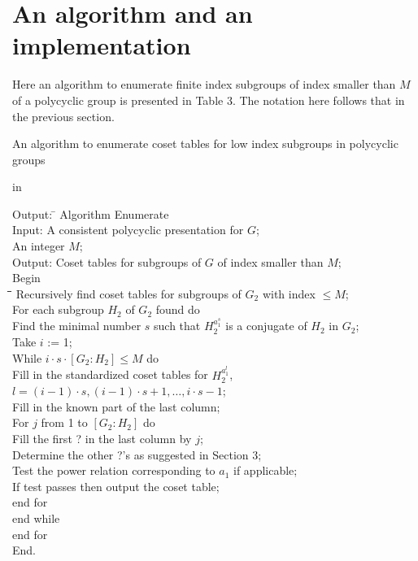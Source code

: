 \documentclass[12 pt]{article}
\begin{document}
\section{An algorithm and an implementation}

Here an algorithm to enumerate finite index subgroups of
index smaller than $M$ of a polycyclic
group is presented in Table 3.
The notation here follows that in the previous section.

\begin{table}
\caption{An algorithm to enumerate coset tables for low index subgroups in
polycyclic groups}
 in
\begin{tabbing}
Output: \=\kill
Algorithm Enumerate\\
Input:  \>A consistent polycyclic presentation for $G$;\\
        \>An integer $M$;\\
Output: \>Coset tables for subgroups of $G$ of index smaller than $M$;\\
Begin\\
\quad\=\quad\=\quad\=\quad\=\kill
\>Recursively find coset tables for subgroups
of $G_2$ with index
$\le M$;\\
\>For each subgroup $H_2$ of $G_2$ found do\\
\>\>Find the minimal number $s$ such that $H_2^{a_1^s}$ is a conjugate
of $H_2$ in $G_2$;\\
\>\>Take $i$ := 1;\\
\>\>While $i\cdot s\cdot[G_2:H_2]\le M$ do\\
\>\>\>Fill in the standardized coset tables for $H_2^{a_1^l}$,\\
\>\>\>\>$l=
(i-1)\cdot s,(i-1)\cdot s+1,\ldots,i\cdot s-1$;\\
\>\>\>Fill in the known part of the last column;\\
\>\>\>For $j$ from 1 to $[G_2:H_2]$ do\\
\>\>\>\>Fill the first ? in the last column by $j$;\\
\>\>\>\>Determine the other ?'s as suggested in Section 3;\\
\>\>\>\>Test the power relation corresponding to $a_1$ if applicable;\\
\>\>\>\>If test passes then output the coset table;\\
\>\>\>end for\\
\>\>end while\\
\>end for\\
End.\\
\end{tabbing}
\end{table}
\end{document}
